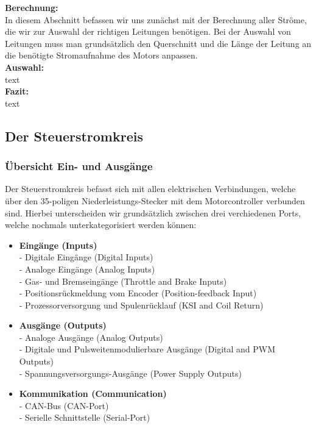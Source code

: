 \textbf{Berechnung:} 
\\[2mm]
In diesem Abschnitt befassen wir uns zunächst mit der Berechnung aller Ströme, die wir zur Auswahl der richtigen Leitungen benötigen. Bei der Auswahl von Leitungen muss man grundsätzlich den Querschnitt und die Länge der Leitung an die benötigte Stromaufnahme des Motors anpassen.
\\[5mm]

\textbf{Auswahl:}
\\[2mm]
text
\\[5mm]

\textbf{Fazit:}
\\[2mm]
text

\newpage



\subsection{Der Steuerstromkreis}
\subsubsection{Übersicht Ein- und Ausgänge}
Der Steuerstromkreis befasst sich mit allen elektrischen Verbindungen, welche über den  35-poligen Niederleistungs-Stecker mit dem Motorcontroller verbunden sind. Hierbei unterscheiden wir grundsätzlich zwischen drei verchiedenen Ports, welche nochmals unterkategorisiert werden können:

\vspace{3mm}

\begin{itemize}
	\item \textbf{Eingänge (Inputs)}
	\\ - Digitale Eingänge (Digital Inputs)
	\\ - Analoge Eingänge (Analog Inputs)
	\\ - Gas- und Bremseingänge (Throttle and Brake Inputs)
	\\ - Positionsrückmeldung vom Encoder (Position-feedback Input)
	\\ - Prozessorversorgung und Spulenrücklauf (KSI and Coil Return)
	\item \textbf{Ausgänge (Outputs)}
	\\ - Analoge Ausgänge (Analog Outputs)
	\\ - Digitale und Pulsweitenmodulierbare Ausgänge (Digital and PWM Outputs)
	\\ - Spannungsversorgungs-Ausgänge (Power Supply Outputs)
	\item \textbf{Kommunikation (Communication)}
	\\ -  CAN-Bus (CAN-Port)
	\\ -  Serielle Schnittstelle (Serial-Port)
\end{itemize}

